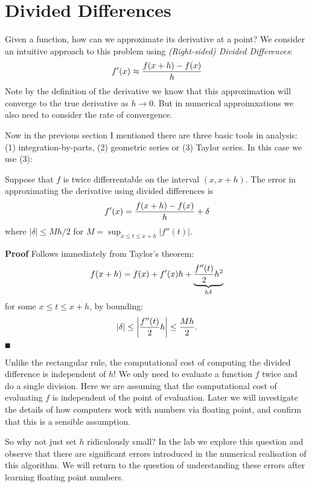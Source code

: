 
\section{Divided Differences}
Given a function, how can we approximate its derivative at a point? We consider an intuitive approach to this problem using \emph{(Right-sided) Divided Differences}: 
\[
f'(x) \ensuremath{\approx} {f(x+h) - f(x) \over h}
\]
Note by the definition of the derivative we know that this approximation will converge to the true derivative as $h \ensuremath{\rightarrow} 0$. But in numerical approimxations we also need to consider the rate of convergence. 

Now in the previous section I mentioned there are three basic tools in analysis:  (1) integration-by-parts, (2) geometric series or (3) Taylor series. In this case we use (3):

\begin{proposition} Suppose that $f$ is twice differrentable on the interval $(x,x+h)$. The error in approximating the derivative using divided differences is
\[
f'(x) = {f(x+h) - f(x) \over h} + \ensuremath{\delta}
\]
where $|\ensuremath{\delta}| \ensuremath{\leq} Mh/2$ for  $M = \sup_{x \ensuremath{\leq} t \ensuremath{\leq} x+h} |f''(t)|$.

\end{proposition}
\textbf{Proof} Follows immediately from Taylor's theorem:
\[
f(x+h) = f(x) + f'(x) h + \underbrace{{f''(t) \over 2} h^2}_{h \ensuremath{\delta}}
\]
for some $x \ensuremath{\leq} t \ensuremath{\leq} x+h$, by bounding:
\[
|\delta| \leq \left|{{f''(t) \over 2} h}\right| \leq {M  h \over 2}.
\]
\ensuremath{\QED}

Unlike the rectangular rule, the computational cost of computing the divided difference is independent of $h$! We only need to evaluate a function $f$ twice and do a single division. Here we are assuming that the computational cost of evaluating $f$ is independent of the point of evaluation. Later we will investigate the details of how computers work with numbers via floating point,  and confirm that this is a sensible assumption.

So why not just set $h$ ridiculously small? In the lab we explore this question and observe that there are significant errors introduced in the numerical realisation of this algorithm. We will return to the question of understanding these errors after learning floating point numbers. 

